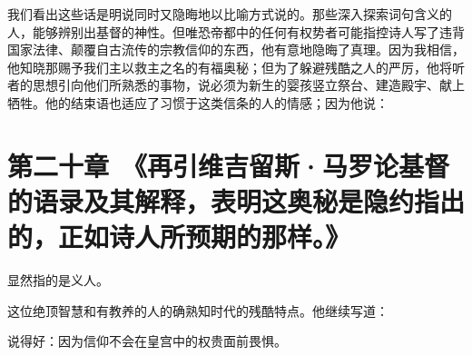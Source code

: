 我们看出这些话是明说同时又隐晦地以比喻方式说的。那些深入探索词句含义的人，能够辨别出基督的神性。但唯恐帝都中的任何有权势者可能指控诗人写了违背国家法律、颠覆自古流传的宗教信仰的东西，他有意地隐晦了真理。因为我相信，他知晓那赐予我们主以救主之名的有福奥秘；但为了躲避残酷之人的严厉，他将听者的思想引向他们所熟悉的事物，说必须为新生的婴孩竖立祭台、建造殿宇、献上牺牲。他的结束语也适应了习惯于这类信条的人的情感；因为他说：\par


\section{第二十章　《再引维吉留斯·马罗论基督的语录及其解释，表明这奥秘是隐约指出的，正如诗人所预期的那样。》}

\par

显然指的是义人。\par

\par

这位绝顶智慧和有教养的人的确熟知时代的残酷特点。他继续写道：\par

\par

说得好：因为信仰不会在皇宫中的权贵面前畏惧。\par

\par

